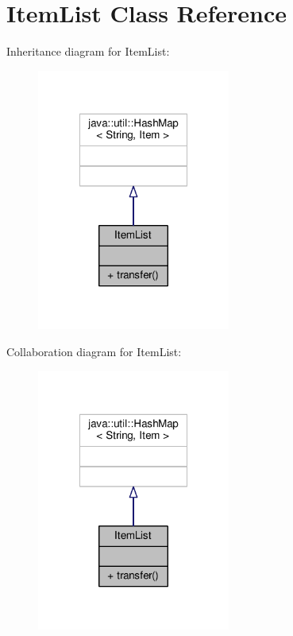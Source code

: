 \hypertarget{classItemList}{\section{Item\-List Class Reference}
\label{classItemList}
}


Inheritance diagram for Item\-List\-:
\nopagebreak
\begin{figure}[H]
\begin{center}
\leavevmode
\includegraphics[width=180pt]{classItemList__inherit__graph}
\end{center}
\end{figure}


Collaboration diagram for Item\-List\-:
\nopagebreak
\begin{figure}[H]
\begin{center}
\leavevmode
\includegraphics[width=180pt]{classItemList__coll__graph}
\end{center}
\end{figure}
